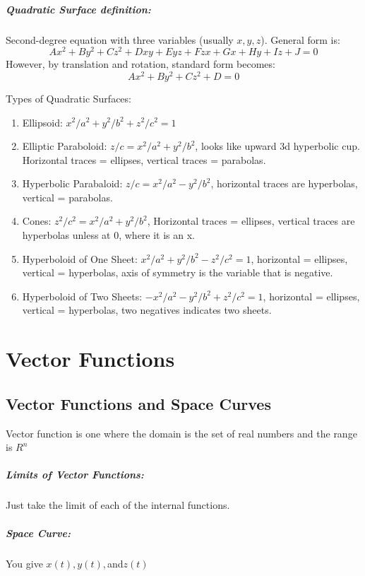 \documentclass[a4paper,12pt]{report}
\begin{document}
\paragraph{Quadratic Surface definition: } Second-degree equation with three variables (usually $x, y, z$). General form is:
$$Ax^2 + By^2 + Cz^2 + Dxy + Eyz + Fzx + Gx + Hy + Iz + J = 0 $$
However, by translation and rotation, standard form becomes:
$$Ax^2 + By^2 + Cz^2 + D = 0$$

Types of Quadratic Surfaces:
\begin{enumerate}
\item Ellipsoid: $x^2/a^2 + y^2/b^2 + z^2/c^2 = 1$ 
\item Elliptic Paraboloid: $z/c = x^2/a^2 + y^2/b^2$, looks like upward 3d hyperbolic cup. Horizontal traces = ellipses, vertical traces = parabolas. 
\item Hyperbolic Parabaloid: $z/c = x^2/a^2 - y^2/b^2$, horizontal traces are hyperbolas, vertical = parabolas. 
\item Cones: $z^2/c^2 = x^2/a^2 + y^2/b^2$, Horizontal traces = ellipses, vertical traces are hyperbolas unless at 0, where it is an x.
\item Hyperboloid of One Sheet: $x^2/a^2 + y^2/b^2 - z^2/c^2 = 1$, horizontal = ellipses, vertical = hyperbolas, axis of symmetry is the variable that is negative. 
\item Hyperboloid of Two Sheets: $-x^2/a^2 - y^2/b^2 + z^2/c^2 = 1$, horizontal = ellipses, vertical = hyperbolas, two negatives indicates two sheets.
\end{enumerate}

\chapter{Vector Functions}
\section{Vector Functions and Space Curves}
Vector function is one where the domain is the set of real numbers and the range is $R^n$

\paragraph{Limits of Vector Functions: } Just take the limit of each of the internal functions.

\paragraph{Space Curve: } You give $x(t), y(t), $and$ z(t)$ 
\end{document}
